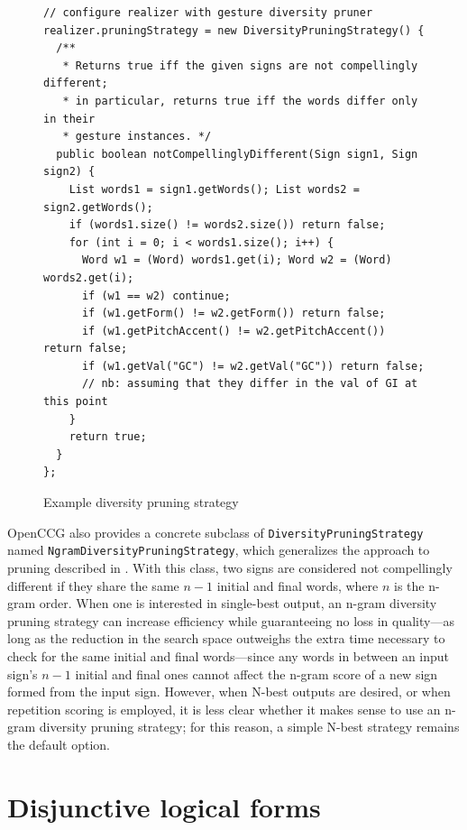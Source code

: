 \documentclass[11pt]{article}
\newcommand{\code}[1]{\texttt{#1}} %
\begin{document}
\begin{figure}%
\begin{center}
\begin{lstlisting}
// configure realizer with gesture diversity pruner
realizer.pruningStrategy = new DiversityPruningStrategy() {
  /** 
   * Returns true iff the given signs are not compellingly different; 
   * in particular, returns true iff the words differ only in their  
   * gesture instances. */
  public boolean notCompellinglyDifferent(Sign sign1, Sign sign2) {
    List words1 = sign1.getWords(); List words2 = sign2.getWords();
    if (words1.size() != words2.size()) return false;
    for (int i = 0; i < words1.size(); i++) {
      Word w1 = (Word) words1.get(i); Word w2 = (Word) words2.get(i);
      if (w1 == w2) continue;
      if (w1.getForm() != w2.getForm()) return false;
      if (w1.getPitchAccent() != w2.getPitchAccent()) return false;
      if (w1.getVal("GC") != w2.getVal("GC")) return false;
      // nb: assuming that they differ in the val of GI at this point 
    }
    return true;
  }
};
\end{lstlisting}
\caption{Example diversity pruning strategy}
\label{gest-diversity-strategy}
\end{center}
\end{figure}

OpenCCG also provides a concrete subclass of
\code{Diversity\-Pruning\-Strategy} named
\code{Ngram\-Diversity\-Pruning\-Strategy}, which generalizes the
approach to pruning described in \cite{Langkilde:2000}. With this class,
two signs are considered not compellingly different if they share the
same $n\!-\!1$ initial and final words, where $n$ is the n-gram order.
When one is interested in single-best output, an n-gram diversity
pruning strategy can increase efficiency while guaranteeing no loss in
quality---as long as the reduction in the search space outweighs the
extra time necessary to check for the same initial and final
words---since any words in between an input sign's $n\!-\!1$ initial and
final ones cannot affect the n-gram score of a new sign formed from the
input sign. However, when N-best outputs are desired, or when repetition
scoring is employed, it is less clear whether it makes sense to use an
n-gram diversity pruning strategy; for this reason, a simple N-best
strategy remains the default option.


\section{Disjunctive logical forms}
\label{sec:disj-lf}
\end{document}
